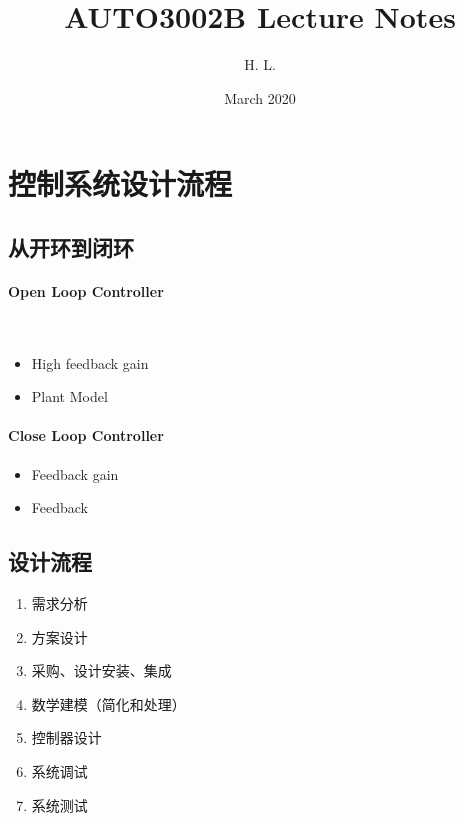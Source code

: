 \documentclass[14pt,a4paper]{article}
\title{AUTO3002B Lecture Notes}
\author{H. L.}
\date{March 2020}
\theoremstyle{plain}
\theoremstyle{definition}
\theoremstyle{remark}
\theoremstyle{plain}
\theoremstyle{plain}
\theoremstyle{definition}
\begin{document}
	\maketitle
	\newpage
	\tableofcontents %
	\newpage
		
	\section{控制系统设计流程}%
	\label{sec:控制系统设计流程} 
	
		\subsection{从开环到闭环}%
		\label{sub:从开环到闭环}
		
			\paragraph{Open Loop Controller}%
			\label{par:open_loop_controller}
				\ 	
				\begin{itemize}
					\item High feedback gain 
					\item Plant Model 
				\end{itemize} 

			\paragraph{Close Loop Controller}%
			\label{par:close_loop_controller}
			
				\begin{itemize}
					\item Feedback gain 
					\item Feedback
				\end{itemize} 

		\subsection{设计流程}%
		\label{sub:设计流程}
		
			\begin{enumerate}
				\item 需求分析
				\item 方案设计
				\item 采购、设计安装、集成
				\item 数学建模（简化和处理）
				\item 控制器设计
				\item 系统调试
				\item 系统测试
			\end{enumerate} 
\end{document}
